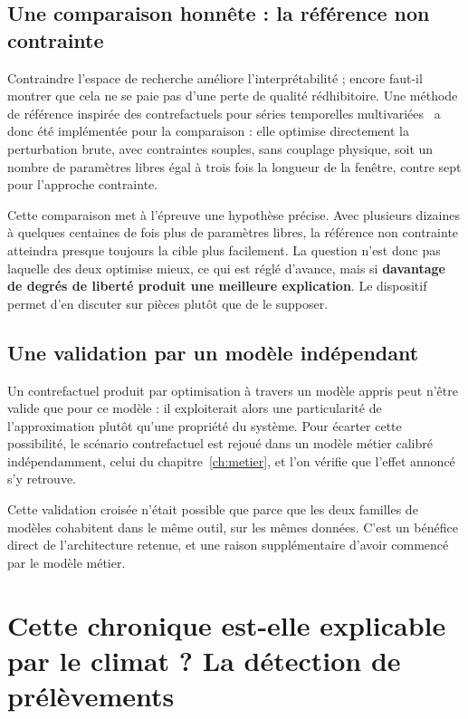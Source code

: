 \subsection{Une comparaison honnête : la référence non contrainte}

Contraindre l'espace de recherche améliore l'interprétabilité ; encore faut-il montrer que cela
ne se paie pas d'une perte de qualité rédhibitoire. Une méthode de référence inspirée des
contrefactuels pour séries temporelles multivariées~\cite{ates2021comte} a donc été implémentée
pour la comparaison : elle optimise directement la perturbation brute, avec contraintes souples,
sans couplage physique, soit un nombre de paramètres libres égal à trois fois la longueur de la
fenêtre, contre sept pour l'approche contrainte.

Cette comparaison met à l'épreuve une hypothèse précise. Avec plusieurs dizaines à quelques centaines de fois plus de
paramètres libres, la référence non contrainte atteindra presque toujours la cible plus
facilement. La question n'est donc pas laquelle des deux optimise mieux, ce qui est réglé
d'avance, mais si \textbf{davantage de degrés de liberté produit une meilleure explication}. Le
dispositif permet d'en discuter sur pièces plutôt que de le supposer.

\subsection{Une validation par un modèle indépendant}

Un contrefactuel produit par optimisation à travers un modèle appris peut n'être valide que pour
ce modèle : il exploiterait alors une particularité de l'approximation plutôt qu'une propriété du
système. Pour écarter cette possibilité, le scénario contrefactuel est rejoué dans un modèle
métier calibré indépendamment, celui du chapitre~\ref{ch:metier}, et l'on vérifie que l'effet
annoncé s'y retrouve.

Cette validation croisée n'était possible que parce que les deux familles de modèles cohabitent
dans le même outil, sur les mêmes données. C'est un bénéfice direct de l'architecture retenue,
et une raison supplémentaire d'avoir commencé par le modèle métier.

\section{Cette chronique est-elle explicable par le climat ? La détection de prélèvements}

